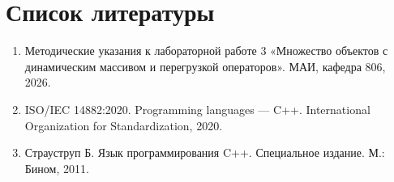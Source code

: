 \section{Список литературы}

\begin{enumerate}
  \item Методические указания к лабораторной работе 3 «Множество объектов с динамическим массивом и перегрузкой операторов». МАИ, кафедра 806, 2026.
  \item ISO/IEC 14882:2020. Programming languages --- C++. International Organization for Standardization, 2020.
  \item Страуструп Б. Язык программирования C++. Специальное издание. М.: Бином, 2011.
\end{enumerate}
